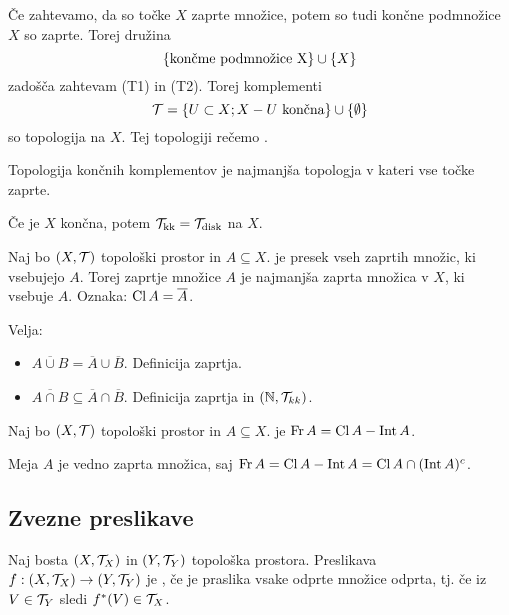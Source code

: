\begin{primer}
    Če zahtevamo, da so točke $X$ zaprte množice, potem so tudi končne podmnožice $X$ so zaprte. Torej družina
    $$\left\{\text{končme podmnožice X}\right\} \cup \left\{X\right\}$$
    zadošča zahtevam (T1) in (T2). Torej komplementi
    $$\mathcal{T} = \left\{U \subset X; X - U \text{ končna}\right\} \cup \left\{\emptyset\right\}$$
    so topologija na $X$. Tej topologiji rečemo .

    Topologija končnih komplementov je najmanjša topologja v kateri vse točke zaprte. 
    
    Če je $X$ končna, potem $\mathcal{T}_{\text{kk}}=\mathcal{T}_{\text{disk}}$ na $X$.
\end{primer}

\begin{definicija}
    Naj bo $(X, \mathcal{T})$ topološki prostor in $A \subseteq X$.  je presek vseh zaprtih množic, ki vsebujejo $A$. Torej zaprtje množice $A$ je najmanjša zaprta množica v $X$, ki vsebuje $A$. Oznaka: $\operatorname{Cl} A = \overline{A}$.
\end{definicija}

\begin{primer}
    Velja:
    \begin{itemize}
        \item $\overline{A \cup B} = \overline{A} \cup \overline{B}$.  Definicija zaprtja.
        \item $\overline{A \cap B} \subseteq \overline{A} \cap \overline{B}$.  Definicija zaprtja in $(\mathbb{N}, \mathcal{T}_{kk})$.
    \end{itemize}
\end{primer}

\begin{definicija}
    Naj bo $(X, \mathcal{T})$ topološki prostor in $A \subseteq X$.  je $\operatorname{Fr} A = \operatorname{Cl} A - \operatorname{Int} A$.
\end{definicija}

\begin{opomba}
    Meja $A$ je vedno zaprta množica, saj $\operatorname{Fr} A = \operatorname{Cl} A - \operatorname{Int} A = \operatorname{Cl} A \cap (\operatorname{Int} A)^c$.
\end{opomba}

\subsection{Zvezne preslikave}
\begin{definicija}    
    Naj bosta $(X, \mathcal{T}_X)$ in $(Y, \mathcal{T}_Y)$ topološka prostora. Preslikava $f: (X, \mathcal{T}_X) \to (Y, \mathcal{T}_Y)$ je , če je praslika vsake odprte množice odprta, tj. če iz $V \in \mathcal{T}_Y$ sledi $f^{*}(V) \in \mathcal{T}_X$.
\end{definicija}


